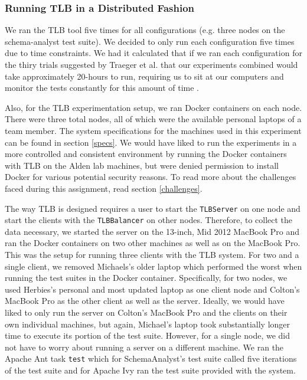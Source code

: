 \documentclass{article}
\begin{document}
{\subsubsection{Running TLB in a Distributed Fashion}
We ran the TLB tool five times for all configurations (e.g. three nodes on the schema-analyst test suite). We decided
to only run each configuration five times due to time constraints. We had it calculated that if we ran each configuration
for the thiry trials suggested by Traeger et al. that our experiments combined would take approximately 20-hours
to run, requiring us to sit at our computers and monitor the tests constantly for this amount of time \cite{traeger2008nine}.

Also, for the TLB experimentation setup, we ran Docker containers on each node. There were three total nodes, all of which
were the available personal laptops of a team member. The system specifications for the machines used in this experiment
can be found in section \ref{specs}. We would have liked to run the experiments in a more controlled and consistent environment
by running the Docker containers with TLB on the Alden lab machines, but were denied permission to install Docker for various
potential security reasons. To read more about the challenges faced during this assignment, read section \ref{challenges}.

The way TLB is designed requires a user to start the \texttt{TLBServer} on one node and start the clients with the \texttt{TLBBalancer}
on other nodes. Therefore, to collect the data necessary, we started the server on the 13-inch, Mid 2012 MacBook Pro
and ran the Docker containers on two other machines as well as on the MacBook Pro. This was the setup for running three
clients with the TLB system. For two and a single client, we removed Michaels's older laptop which performed the
worst when running the test suites in the Docker container. Specifically, for two nodes, we used Herbies's personal
and most updated laptop as one client node and Colton's MacBook Pro as the other client as well as the server.
Ideally, we would have liked to only run the server on Colton's MacBook Pro and the clients on their own
individual machines, but again, Michael's laptop took substantially longer time to execute its portion of the test suite.
However, for a single node, we did not have to worry about running a server on a different machine. We ran the Apache Ant
task \texttt{test} which for SchemaAnalyst's test suite called five iterations of the test suite and for Apache Ivy
ran the test suite provided with the system.

}
\end{document}
